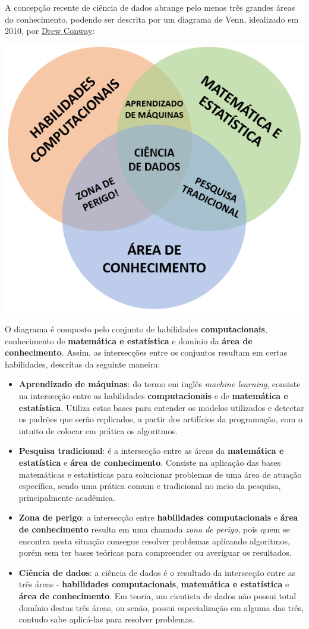 \documentclass[
  brazilian,
]{book}
\let\origfigure\figure
\let\endorigfigure\endfigure
\renewenvironment{figure}[1][2] {
    \expandafter\origfigure\expandafter[H]
} {
    \endorigfigure
}
\begin{document}
A concepção recente de ciência de dados abrange pelo menos três grandes áreas do conhecimento, podendo ser descrita por um diagrama de Venn, idealizado em 2010, por \href{http://drewconway.com/zia/2013/3/26/the-data-science-venn-diagram}{Drew Conway}:

\begin{figure}

{\centering \includegraphics[width=0.5\linewidth]{imagens/venn_pt} 

}

\caption{Diagrama de Venn da ciência de dados.}\label{fig:venn}
\end{figure}

O diagrama é composto pelo conjunto de habilidades \textbf{computacionais}, conhecimento de \textbf{matemática e estatística} e domínio da \textbf{área de conhecimento}. Assim, as intersecções entre os conjuntos resultam em certas habilidades, descritas da seguinte maneira:

\begin{itemize}
\item
  \textbf{Aprendizado de máquinas}: do termo em inglês \emph{machine learning}, consiste na intersecção entre as habilidades \textbf{computacionais} e de \textbf{matemática e estatística}. Utiliza estas bases para entender os modelos utilizados e detectar os padrões que serão replicados, a partir dos artifícios da programação, com o intuito de colocar em prática os algoritmos.
\item
  \textbf{Pesquisa tradicional}: é a intersecção entre as áreas da \textbf{matemática e estatística} e \textbf{área de conhecimento}. Consiste na aplicação das bases matemáticas e estatísticas para solucionar problemas de uma área de atuação específica, sendo uma prática comum e tradicional no meio da pesquisa, principalmente acadêmica.
\item
  \textbf{Zona de perigo}: a intersecção entre \textbf{habilidades computacionais} e \textbf{área de conhecimento} resulta em uma chamada \emph{zona de perigo}, pois quem se encontra nesta situação consegue resolver problemas aplicando algoritmos, porém sem ter bases teóricas para compreender ou averiguar os resultados.
\item
  \textbf{Ciência de dados}: a ciência de dados é o resultado da intersecção entre as três áreas - \textbf{habilidades computacionais}, \textbf{matemática e estatística} e \textbf{área de conhecimento}. Em teoria, um cientista de dados não possui total domínio destas três áreas, ou senão, possui especialização em alguma das três, contudo sabe aplicá-las para resolver problemas.
\end{itemize}
\end{document}
